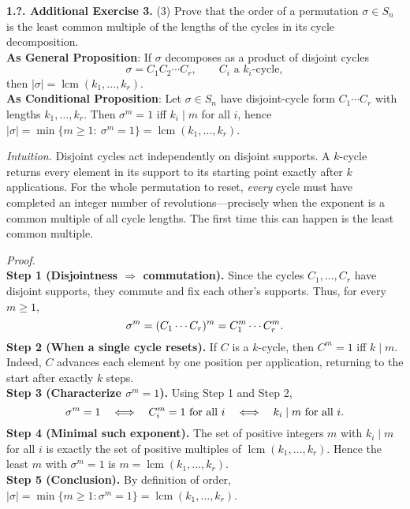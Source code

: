 \documentclass[12pt]{article}
\theoremstyle{definition}
\begin{document}
\newpage

\noindent \textbf{1.?. Additional Exercise 3.}
(3) Prove that the order of a permutation $\sigma\in S_n$ is the least common multiple of the lengths of the cycles in its cycle decomposition.\\ %

\noindent\textbf{As General Proposition}: If $\sigma$ decomposes as a product of disjoint cycles
\[
\sigma=C_1C_2\cdots C_r,\qquad C_i\text{ a }k_i\text{-cycle},
\]
then $|\sigma|=\operatorname{lcm}(k_1,\dots,k_r)$.\\

\noindent \textbf{As Conditional Proposition}: Let $\sigma\in S_n$ have disjoint-cycle form $C_1\cdots C_r$ with lengths $k_1,\dots,k_r$. Then $\sigma^m=1$ iff $k_i\mid m$ for all $i$, hence $|\sigma|=\min\{m\ge1:\ \sigma^m=1\}=\operatorname{lcm}(k_1,\dots,k_r)$.\\

\newpage

\dotfill

\emph{Intuition.} Disjoint cycles act independently on disjoint supports. A $k$-cycle returns every element in its support to its starting point exactly after $k$ applications. For the whole permutation to reset, \emph{every} cycle must have completed an integer number of revolutions—precisely when the exponent is a common multiple of all cycle lengths. The first time this can happen is the least common multiple.\\

\dotfill

\emph{Proof.}\\
\textbf{Step 1 (Disjointness $\Rightarrow$ commutation).} Since the cycles $C_1,\dots,C_r$ have disjoint supports, they commute and fix each other’s supports. Thus, for every $m\ge 1$,
\[
\sigma^m=(C_1\cdots C_r)^m=C_1^m\cdots C_r^m.\\
\]
\textbf{Step 2 (When a single cycle resets).} If $C$ is a $k$-cycle, then $C^m=1$ iff $k\mid m$. Indeed, $C$ advances each element by one position per application, returning to the start after exactly $k$ steps.\\
\textbf{Step 3 (Characterize $\sigma^m=1$).} Using Step 1 and Step 2,
\[
\sigma^m=1 \quad\Longleftrightarrow\quad C_i^m=1\ \text{for all }i
\quad\Longleftrightarrow\quad k_i\mid m\ \text{for all }i.\\
\]
\textbf{Step 4 (Minimal such exponent).} The set of positive integers $m$ with $k_i\mid m$ for all $i$ is exactly the set of positive multiples of $\operatorname{lcm}(k_1,\dots,k_r)$. Hence the least $m$ with $\sigma^m=1$ is $m=\operatorname{lcm}(k_1,\dots,k_r)$.\\
\textbf{Step 5 (Conclusion).} By definition of order, $|\sigma|=\min\{m\ge1:\sigma^m=1\}=\operatorname{lcm}(k_1,\dots,k_r)$.\\
\end{document}

